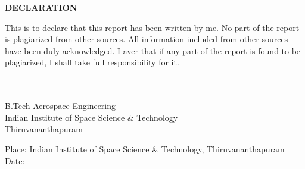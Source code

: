 \newpage
\titlepage{}
\begin{center}
{\LARGE \textbf{\MakeUppercase{Declaration}}\par}
\end{center}
\large
{\Large This is to declare that this report has been written by me. No part of the report is plagiarized from other sources. All information included from other sources have been duly acknowledged. I aver that if any part of the report is found to be plagiarized, I shall take full responsibility for it.\par}
\vfill{}
\begin{flushright}
\nidname{}\\
\nidscode{}\\
B.Tech Aerospace Engineering\\
Indian Institute of Space Science \& Technology\\
Thiruvananthapuram\par
\end{flushright}
\vfill{}
Place: Indian Institute of Space Science \& Technology,
Thiruvananthapuram\\
Date: 

